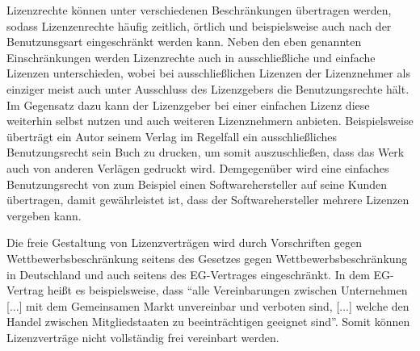 Lizenzrechte können unter verschiedenen Beschränkungen übertragen werden, sodass Lizenzenrechte häufig zeitlich, örtlich und beispielsweise auch nach der Benutzunsgsart eingeschränkt werden kann.
Neben den eben genannten Einschränkungen werden Lizenzrechte auch in ausschließliche und einfache Lizenzen unterschieden, wobei bei ausschließlichen Lizenzen der Lizenznehmer als einziger meist
auch unter Ausschluss des Lizenzgebers die Benutzungsrechte hält. Im Gegensatz dazu kann der Lizenzgeber bei einer einfachen Lizenz diese weiterhin selbst nutzen und auch weiteren Lizenznehmern
anbieten. Beispielsweise überträgt ein Autor seinem Verlag im Regelfall ein ausschließliches Benutzungsrecht sein Buch zu drucken, um somit auszuschließen, dass das Werk auch von anderen Verlägen
gedruckt wird. Demgegenüber wird eine einfaches Benutzungsrecht von zum Beispiel einen Softwarehersteller auf seine Kunden übertragen, damit gewährleistet ist, dass der Softwarehersteller mehrere
Lizenzen vergeben kann.

Die freie Gestaltung von Lizenzverträgen wird durch Vorschriften gegen Wettbewerbsbeschränkung seitens des Gesetzes gegen Wettbewerbsbeschränkung in Deutschland und auch seitens des EG-Vertrages
eingeschränkt. In dem EG-Vertrag heißt es beispielsweise, dass “alle Vereinbarungen zwischen Unternehmen [...] mit dem Gemeinsamen Markt unvereinbar und verboten sind, [...] welche den Handel
zwischen Mitgliedstaaten zu beeinträchtigen geeignet sind”. Somit können Lizenzverträge nicht vollständig frei vereinbart werden.
